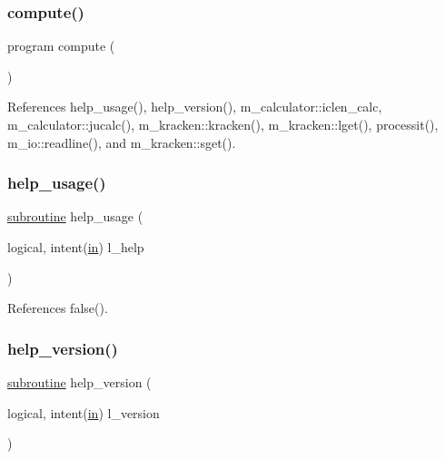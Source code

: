 \subsubsection{\texorpdfstring{compute()}{compute()}}
{\footnotesize\ttfamily program compute (\begin{DoxyParamCaption}{ }\end{DoxyParamCaption})}



References help\+\_\+usage(), help\+\_\+version(), m\+\_\+calculator\+::iclen\+\_\+calc, m\+\_\+calculator\+::jucalc(), m\+\_\+kracken\+::kracken(), m\+\_\+kracken\+::lget(), processit(), m\+\_\+io\+::readline(), and m\+\_\+kracken\+::sget().

\mbox{\label{compute_8f90_a3e09a3b52ee8fb04eeb93fe5761626a8}} 
\subsubsection{\texorpdfstring{help\+\_\+usage()}{help\_usage()}}
{\footnotesize\ttfamily \hyperlink{M__stopwatch_83_8txt_acfbcff50169d691ff02d4a123ed70482}{subroutine} help\+\_\+usage (\begin{DoxyParamCaption}\item[{logical, intent(\hyperlink{M__journal_83_8txt_afce72651d1eed785a2132bee863b2f38}{in})}]{l\+\_\+help }\end{DoxyParamCaption})}



References false().

\mbox{\label{compute_8f90_a39c21619b08a3c22f19e2306efd7f766}} 
\subsubsection{\texorpdfstring{help\+\_\+version()}{help\_version()}}
{\footnotesize\ttfamily \hyperlink{M__stopwatch_83_8txt_acfbcff50169d691ff02d4a123ed70482}{subroutine} help\+\_\+version (\begin{DoxyParamCaption}\item[{logical, intent(\hyperlink{M__journal_83_8txt_afce72651d1eed785a2132bee863b2f38}{in})}]{l\+\_\+version }\end{DoxyParamCaption})}



